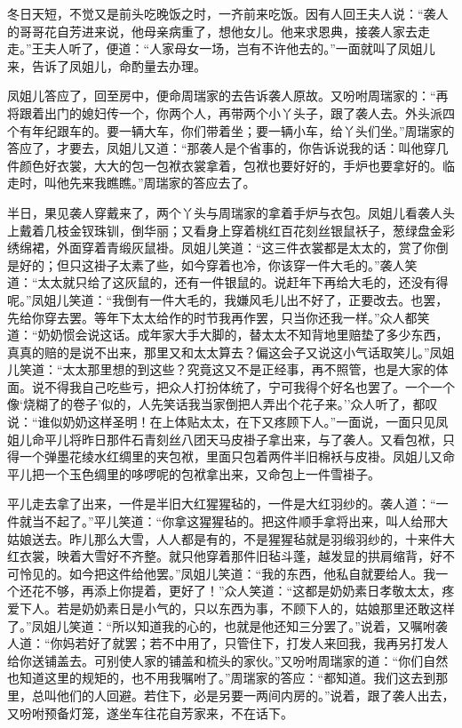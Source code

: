 冬日天短，不觉又是前头吃晚饭之时，一齐前来吃饭。因有人回王夫人说：``袭人的哥哥花自芳进来说，他母亲病重了，想他女儿。他来求恩典，接袭人家去走走。''王夫人听了，便道：``人家母女一场，岂有不许他去的。''一面就叫了凤姐儿来，告诉了凤姐儿，命酌量去办理。

凤姐儿答应了，回至房中，便命周瑞家的去告诉袭人原故。又吩咐周瑞家的：``再将跟着出门的媳妇传一个，你两个人，再带两个小丫头子，跟了袭人去。外头派四个有年纪跟车的。要一辆大车，你们带着坐；要一辆小车，给丫头们坐。''周瑞家的答应了，才要去，凤姐儿又道：``那袭人是个省事的，你告诉说我的话：叫他穿几件颜色好衣裳，大大的包一包袱衣裳拿着，包袱也要好好的，手炉也要拿好的。临走时，叫他先来我瞧瞧。''周瑞家的答应去了。

半日，果见袭人穿戴来了，两个丫头与周瑞家的拿着手炉与衣包。凤姐儿看袭人头上戴着几枝金钗珠钏，倒华丽；又看身上穿着桃红百花刻丝银鼠袄子，葱绿盘金彩绣绵裙，外面穿着青缎灰鼠褂。凤姐儿笑道：``这三件衣裳都是太太的，赏了你倒是好的；但只这褂子太素了些，如今穿着也冷，你该穿一件大毛的。''袭人笑道：``太太就只给了这灰鼠的，还有一件银鼠的。说赶年下再给大毛的，还没有得呢。''凤姐儿笑道：``我倒有一件大毛的，我嫌风毛儿出不好了，正要改去。也罢，先给你穿去罢。等年下太太给作的时节我再作罢，只当你还我一样。''众人都笑道：``奶奶惯会说这话。成年家大手大脚的，替太太不知背地里赔垫了多少东西，真真的赔的是说不出来，那里又和太太算去？偏这会子又说这小气话取笑儿。''凤姐儿笑道：``太太那里想的到这些？究竟这又不是正经事，再不照管，也是大家的体面。说不得我自己吃些亏，把众人打扮体统了，宁可我得个好名也罢了。一个一个像`烧糊了的卷子'似的，人先笑话我当家倒把人弄出个花子来。''众人听了，都叹说：``谁似奶奶这样圣明！在上体贴太太，在下又疼顾下人。''一面说，一面只见凤姐儿命平儿将昨日那件石青刻丝八团天马皮褂子拿出来，与了袭人。又看包袱，只得一个弹墨花绫水红绸里的夹包袱，里面只包着两件半旧棉袄与皮褂。凤姐儿又命平儿把一个玉色绸里的哆啰呢的包袱拿出来，又命包上一件雪褂子。

平儿走去拿了出来，一件是半旧大红猩猩毡的，一件是大红羽纱的。袭人道：``一件就当不起了。''平儿笑道：``你拿这猩猩毡的。把这件顺手拿将出来，叫人给邢大姑娘送去。昨儿那么大雪，人人都是有的，不是猩猩毡就是羽缎羽纱的，十来件大红衣裳，映着大雪好不齐整。就只他穿着那件旧毡斗蓬，越发显的拱肩缩背，好不可怜见的。如今把这件给他罢。''凤姐儿笑道：``我的东西，他私自就要给人。我一个还花不够，再添上你提着，更好了！''众人笑道：``这都是奶奶素日孝敬太太，疼爱下人。若是奶奶素日是小气的，只以东西为事，不顾下人的，姑娘那里还敢这样了。''凤姐儿笑道：``所以知道我的心的，也就是他还知三分罢了。''说着，又嘱咐袭人道：``你妈若好了就罢；若不中用了，只管住下，打发人来回我，我再另打发人给你送铺盖去。可别使人家的铺盖和梳头的家伙。''又吩咐周瑞家的道：``你们自然也知道这里的规矩的，也不用我嘱咐了。''周瑞家的答应：``都知道。我们这去到那里，总叫他们的人回避。若住下，必是另要一两间内房的。''说着，跟了袭人出去，又吩咐预备灯笼，遂坐车往花自芳家来，不在话下。

